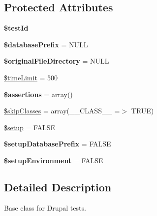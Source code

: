 \subsection*{Protected Attributes}
\begin{DoxyCompactItemize}
\item 
\hypertarget{classDrupalTestCase_a04c476de2bcf67cda4fdfc23d92b5924}{
{\bfseries \$testId}}
\label{classDrupalTestCase_a04c476de2bcf67cda4fdfc23d92b5924}

\item 
\hypertarget{classDrupalTestCase_ab50922223fddbc71cd6bebbfba7ce62f}{
{\bfseries \$databasePrefix} = NULL}
\label{classDrupalTestCase_ab50922223fddbc71cd6bebbfba7ce62f}

\item 
\hypertarget{classDrupalTestCase_abc9180c73bd83f311c30e85045fdfe40}{
{\bfseries \$originalFileDirectory} = NULL}
\label{classDrupalTestCase_abc9180c73bd83f311c30e85045fdfe40}

\item 
\hyperlink{classDrupalTestCase_a3718dfe6f376857a54eff711c720ed01}{\$timeLimit} = 500
\item 
\hypertarget{classDrupalTestCase_a9293d7fd953aeb2c38da939e73d40af6}{
{\bfseries \$assertions} = array()}
\label{classDrupalTestCase_a9293d7fd953aeb2c38da939e73d40af6}

\item 
\hyperlink{classDrupalTestCase_a2b29918aec212576b048e0ffa8fd5b89}{\$skipClasses} = array(\_\-\_\-CLASS\_\-\_\- =$>$ TRUE)
\item 
\hyperlink{classDrupalTestCase_a3a4fcc47d7c5768a93169285fa46a3fb}{\$setup} = FALSE
\item 
\hypertarget{classDrupalTestCase_a5d38b8d88551b2b595c8c26171fc2717}{
{\bfseries \$setupDatabasePrefix} = FALSE}
\label{classDrupalTestCase_a5d38b8d88551b2b595c8c26171fc2717}

\item 
\hypertarget{classDrupalTestCase_a951505c8120361d0ab7b3fb218f495dc}{
{\bfseries \$setupEnvironment} = FALSE}
\label{classDrupalTestCase_a951505c8120361d0ab7b3fb218f495dc}

\end{DoxyCompactItemize}


\subsection{Detailed Description}
Base class for Drupal tests.

